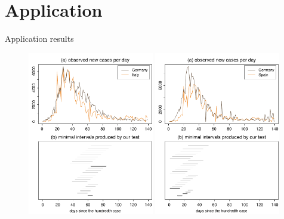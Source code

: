 \documentclass[10pt]{beamer}
\begin{document}
\section{Application}
\begin{frame}{Application results}
	\begin{figure}
		\includegraphics[width=0.49\textwidth]{plots/DEU_vs_ITA_presentation}
		\hfill
		\includegraphics[width=0.49\textwidth]{plots/DEU_vs_ESP_presentation}
	\end{figure}
\end{frame}
\end{document}
